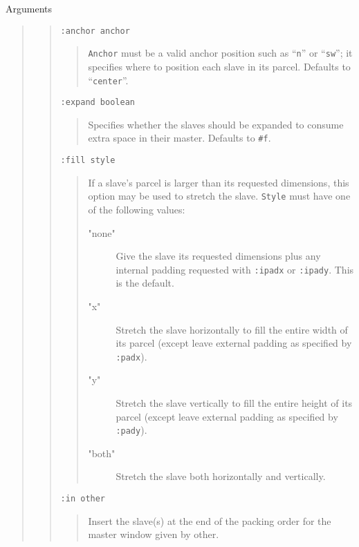 \begin{schemedoc}{Arguments}
\begin{quote}
\begin{quote}
\par
{\tt :anchor anchor}
        \begin{quote}
                     {\tt Anchor} must be a valid anchor position such as
                     ``{\tt n}'' or ``{\tt sw}''; it specifies where to
                     position each slave in its parcel.  Defaults to 
                     ``{\tt center}''.
        \end{quote}
\par
{\tt :expand boolean}
        \begin{quote}
                     Specifies   whether  the  slaves  should  be
                     expanded to consume  extra  space  in  their
                     master.  Defaults to {\tt \#f}.
        \end{quote}
\par
{\tt :fill style}
        \begin{quote}
         If a  slave's  parcel  is  larger  than  its
         requested  dimensions,  this  option  may be
         used to stretch the slave.  {\tt Style} must  have
         one of the following values:

         \begin{description}
          \item["none"]   Give  the slave its requested dimensions
                  plus  any  internal   padding
                 requested  with  {\tt :ipadx}  or  {\tt :ipady}.
                 This is the default.

          \item["x"]  Stretch the  slave  horizontally  to
                 fill  the entire width of its parcel
                 (except leave  external  padding  as
                 specified by {\tt :padx}).

          \item["y"]      Stretch the slave vertically to fill
                 the  entire  height  of  its  parcel
                 (except  leave  external  padding as
                 specified by {\tt :pady}).

          \item["both"]   Stretch the slave both  horizontally
                 and vertically.
         \end{description}
         \end{quote}
\par
{\tt :in other} 
        \begin{quote} 
        Insert the slave(s) at the end of the packing
        order for the master window given by other.  
        \end{quote}


\end{quote}
\end{quote}
\end{schemedoc}
